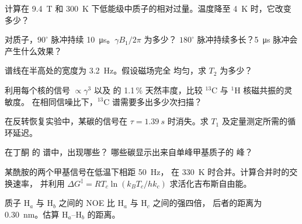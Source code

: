 \begin{exercise}[$\star$]\label{exo:b3:advanced-nmr:2}
计算在 \qty{9.4}{T} 和
\qty{300}{K} 下低能级中质子的相对过量。温度降至 \qty{4}{K} 时，它改变多少？
\end{exercise}

\begin{exercise}[$\star$]\label{exo:b3:advanced-nmr:3}
对质子，$90^\circ$ 脉冲持续 \qty{10}{\micro s}。$\gamma B_1/2\pi$ 为多少？
$180^\circ$ 脉冲持续多长？\qty{5}{\micro s} 脉冲会产生什么效果？
\end{exercise}

\begin{exercise}[$\star$]\label{exo:b3:advanced-nmr:4}
谱线在半高处的宽度为 \qty{3.2}{Hz}。假设磁场完全
均匀，求 $T_2$ 为多少？
\end{exercise}

\begin{exercise}[$\star\star$]\label{exo:b3:advanced-nmr:5}
利用每个核的信号 $\propto\gamma^3$ 以及
 的 1.1\,\% 天然丰度，比较 ${}^{13}$C 与 ${}^1$H 核磁共振的灵敏度。
在相同信噪比下，${}^{13}$C 谱需要多出多少次扫描？
\end{exercise}

\begin{exercise}[$\star\star$]\label{exo:b3:advanced-nmr:6}
在反转恢复实验中，某碳的信号在
$\tau = \qty{1.39}{s}$ 时消失。求 $T_1$ 及定量测定所需的循环延迟。
\end{exercise}

\begin{exercise}[$\star\star$]\label{exo:b3:advanced-nmr:7}
在丁酮  的  谱中，出现哪些？
哪些碳显示出来自单峰甲基质子的  峰？
\end{exercise}

\begin{exercise}[$\star\star$]\label{exo:b3:advanced-nmr:8}
某酰胺的两个甲基信号在低温下相距 \qty{50}{Hz}，
在 \qty{330}{K} 时合并。计算合并时的交换速率，
并利用 $\Delta G^\ddagger = RT_c\ln(k_BT_c/hk_c)$ 求活化吉布斯自由能。
\end{exercise}

\begin{exercise}[$\star\star$]\label{exo:b3:advanced-nmr:9}
质子 H$_a$ 与 H$_b$ 之间的 NOE 比 H$_a$ 与 H$_c$ 之间的强四倍，
后者的距离为 \qty{0.30}{nm}。估算 H$_a$--H$_b$ 的距离。
\end{exercise}

